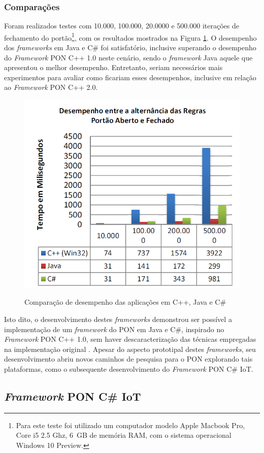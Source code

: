 \subsubsection{Comparações}

Foram realizados testes com 10.000, 100.000, 20.0000 e 500.000 iterações de
fechamento do portão\footnote{Para este teste foi utilizado um computador modelo
Apple Macbook Pro, Core i5 2.5 Ghz, 6 GB de memória RAM, com o sistema
operacional Windows 10 Preview.}, com os resultados mostrados na Figura
\ref{fig:comp_henzen}. O desempenho dos \textit{frameworks} em Java e C\# foi
satisfatório, inclusive superando o desempenho do \textit{Framework} PON C++ 1.0
neste cenário, sendo o \textit{framework} Java aquele que apresentou o melhor
desempenho. Entretanto, seriam necessários mais experimentos para avaliar como
ficariam esses desempenhos, inclusive em relação ao \textit{Framework} PON C++
2.0.

\begin{figure}[!htb]
  \centering
  \caption{Comparação de desempenho das aplicações em C++, Java e C\#}
  \includegraphics[width=.5\textwidth]{../figures/comp_henzen.png}
  \label{fig:comp_henzen}
\end{figure}

Isto dito, o desenvolvimento destes \textit{frameworks} demonstrou ser possível
a implementação de um \textit{framework} do PON em Java e C\#, inspirado no
\textit{Framework} PON C++ 1.0, sem haver descaracterização das técnicas
empregadas na implementação original \cite{henzen_2015}. Apesar do aspecto
prototipal destes \textit{frameworks}, seu desenvolvimento abriu novos caminhos
de pesquisa para o PON explorando tais plataformas, como o subsequente
desenvolvimento do \textit{Framework} PON C\# IoT.

\FloatBarrier

\subsection{\textit{Framework} PON C\# IoT}

